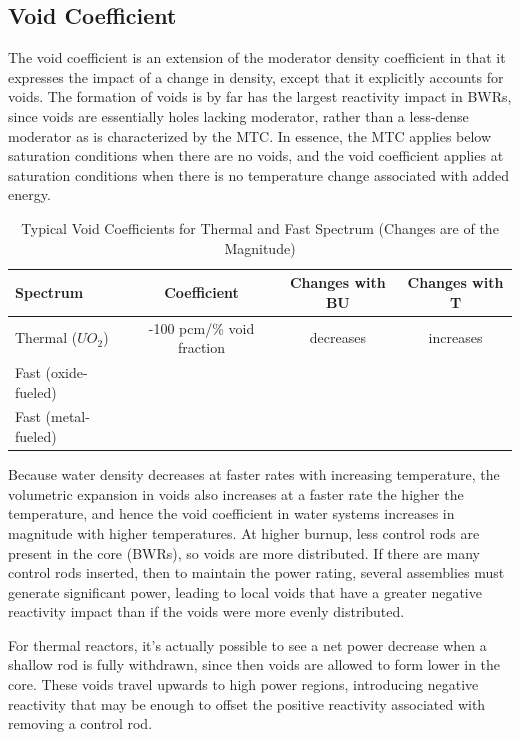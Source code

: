 \documentclass[10pt]{article}
\begin{document}
\begin{flushleft}
\subsection{Void Coefficient}

The void coefficient is an extension of the moderator density coefficient in that it expresses the impact of a change in density, except that it explicitly accounts for voids. The formation of voids is by far has the largest reactivity impact in BWRs, since voids are essentially holes lacking moderator, rather than a less-dense moderator as is characterized by the MTC. In essence, the MTC applies below saturation conditions when there are no voids, and the void coefficient applies at saturation conditions when there is no temperature change associated with added energy. 

\begin{table}[h]
\caption{Typical Void Coefficients for Thermal and Fast Spectrum (Changes are of the Magnitude)}
\centering
\begin{tabular}{l c c c}
\hline\hline
 Spectrum & Coefficient & Changes with BU & Changes with T
\\ [0.5ex]
\hline
Thermal (\(UO_2\)) & -100 pcm/\% void fraction & decreases & increases \\
Fast (oxide-fueled) &  &  & \\
Fast (metal-fueled) &  &  & \\
\hline
\end{tabular}
\label{tab:PPer}
\end{table}

Because water density decreases at faster rates with increasing temperature, the volumetric expansion in voids also increases at a faster rate the higher the temperature, and hence the void coefficient in water systems increases in magnitude with higher temperatures. At higher burnup, less control rods are present in the core (BWRs), so voids are more distributed. If there are many control rods inserted, then to maintain the power rating, several assemblies must generate significant power, leading to local voids that have a greater negative reactivity impact than if the voids were more evenly distributed. 

For thermal reactors, it’s actually possible to see a net power decrease when a shallow rod is fully withdrawn, since then voids are allowed to form lower in the core. These voids travel upwards to high power regions, introducing negative reactivity that may be enough to offset the positive reactivity associated with removing a control rod. 


\end{flushleft}
\end{document}
